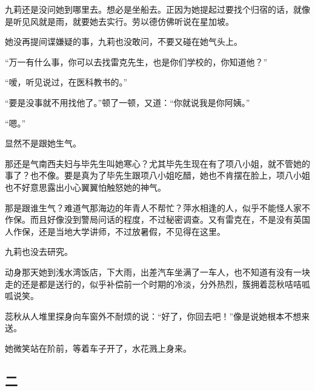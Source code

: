 \par 九莉还是没问她到哪里去。想必是坐船去。正因为她提起过要找个归宿的话，就像是听见风就是雨，就要她去实行。劳以德仿佛听说在星加坡。
\par 她没再提间谍嫌疑的事，九莉也没敢问，不要又碰在她气头上。
\par “万一有什么事，你可以去找雷克先生，也是你们学校的，你知道他？”
\par “嗳，听见说过，在医科教书的。”
\par “要是没事就不用找他了。”顿了一顿，又道：“你就说我是你阿姨。”
\par “嗯。”
\par 显然不是跟她生气。
\par 那还是气南西夫妇与毕先生叫她寒心？尤其毕先生现在有了项八小姐，就不管她的事了？也不像。要是真为了毕先生跟项八小姐吃醋，她也不肯摆在脸上，项八小姐也不好意思露出小心翼翼怕触怒她的神气。
\par 那是跟谁生气？难道气那海边的年青人不帮忙？萍水相逢的人，似乎不能怪人家不作保。而且好像没到警局问话的程度，不过秘密调查。又有雷克在，不是没有英国人作保，还是当地大学讲师，不过放暑假，不见得在这里。
\par 九莉也没去研究。
\par 动身那天她到浅水湾饭店，下大雨，出差汽车坐满了一车人，也不知道有没有一块走的还是都是送行的，似乎补偿前一个时期的冷淡，分外热烈，簇拥着蕊秋咭咭呱呱说笑。
\par 蕊秋从人堆里探身向车窗外不耐烦的说：“好了，你回去吧！”像是说她根本不想来送。
\par 她微笑站在阶前，等着车子开了，水花溅上身来。




\subsection{二}

